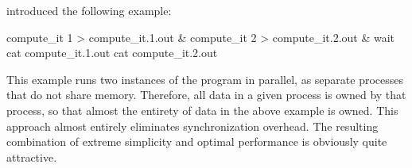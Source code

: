 introduced the following example:

\begin{VerbatimN}[samepage=true]
compute_it 1 > compute_it.1.out &
compute_it 2 > compute_it.2.out &
wait
cat compute_it.1.out
cat compute_it.2.out
\end{VerbatimN}

This example runs two instances of the  program in
parallel, as separate processes that do not share memory.
Therefore, all data in a given process is owned by that process,
so that almost the entirety of data in the above example is owned.
This approach almost entirely eliminates synchronization overhead.
The resulting combination of extreme simplicity and optimal performance
is obviously quite attractive.

